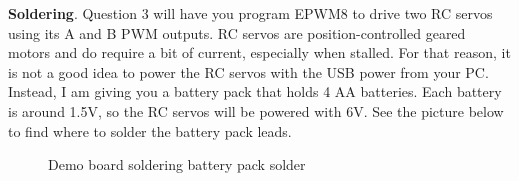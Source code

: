 \documentclass[11pt]{article}
\begin{document}
\textbf{Soldering}. Question 3 will have you program EPWM8 to drive two RC servos using its A and B PWM outputs. RC servos are position-controlled geared motors and do require a bit of current, especially when stalled. For that reason, it is not a good idea to power the RC servos with the USB power from your PC. Instead, I am giving you a battery pack that holds 4 AA batteries. Each battery is around 1.5V, so the RC servos will be powered with 6V. See the picture below to find where to solder the battery pack leads.
%
\begin{figure}[H]
    \centering
    \begin{subfigure}[b]{0.395\textwidth}
        \centering
    \end{subfigure}
    \hfill
    \begin{subfigure}[b]{0.595\textwidth}
        \centering
    \end{subfigure}
    \caption{Demo board soldering battery pack solder}
\end{figure}
%
\end{document}
